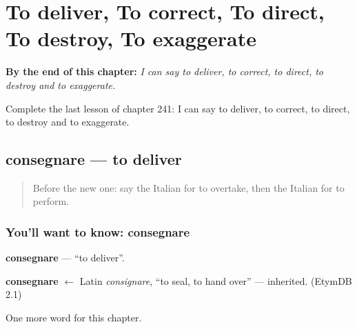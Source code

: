 
\chapter{To deliver, To correct, To direct, To destroy, To exaggerate}
\label{ch:it-to-deliver-to-correct-to-direct-to-destroy-to-exaggerate}

\begin{chapteropening}
\textbf{By the end of this chapter:} \emph{I can say to deliver, to correct, to direct, to destroy and to exaggerate.}

Complete the last lesson of chapter 241: I can say to deliver, to correct, to direct, to destroy and to exaggerate.
\end{chapteropening}

\section[consegnare]{consegnare — to deliver}

\label{lesson:IT-C241-consegnare}



\begin{quote}
Before the new one: say the Italian for to overtake, then the Italian for to perform.
\end{quote}

\subsection*{You'll want to know: consegnare}
\textbf{consegnare} — \textquotedblleft{}to deliver\textquotedblright{}.

\begin{cousinweb}
\textbf{consegnare} $\leftarrow$ Latin \emph{consignare}, \textquotedblleft{}to seal, to hand over\textquotedblright{} — inherited. (EtymDB 2.1)
\end{cousinweb}

\begin{grammarlens}[title={What you've built}]
One more word for this chapter.
\end{grammarlens}

